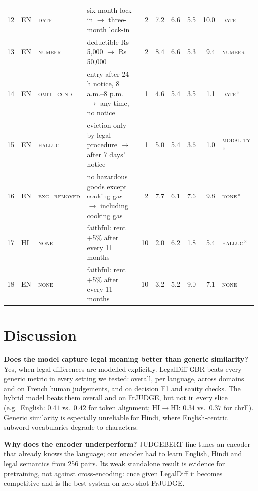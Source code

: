 \begin{table}[t]
\begin{tabular}{@{}rllp{7.4cm}rrrrrl@{}}
12 & EN & \textsc{date} & six-month lock-in $\rightarrow$ three-month lock-in & 2 & 7.2 & 6.6 & 5.5 & 10.0 & \textsc{date} \\
13 & EN & \textsc{number} & deductible Rs 5,000 $\rightarrow$ Rs 50,000 & 2 & 8.4 & 6.6 & 5.3 & 9.4 & \textsc{number} \\
14 & EN & \textsc{omit\_cond} & entry after 24-h notice, 8 a.m.--8 p.m. $\rightarrow$ any time, no notice & 1 & 4.6 & 5.4 & 3.5 & 1.1 & \textsc{date}$^{\times}$ \\
15 & EN & \textsc{halluc} & eviction only by legal procedure $\rightarrow$ after 7 days' notice & 1 & 5.0 & 5.4 & 3.6 & 1.0 & \textsc{modality}$^{\times}$ \\
16 & EN & \textsc{exc\_removed} & no hazardous goods except cooking gas $\rightarrow$ including cooking gas & 2 & 7.7 & 6.1 & 7.6 & 9.8 & \textsc{none}$^{\times}$ \\
17 & HI & \textsc{none} & faithful: rent +5\% after every 11 months & 10 & 2.0 & 6.2 & 1.8 & 5.4 & \textsc{halluc}$^{\times}$ \\
18 & EN & \textsc{none} & faithful: rent +5\% after every 11 months & 10 & 3.2 & 5.2 & 9.0 & 7.1 & \textsc{none} \\
\bottomrule
\end{tabular}
\end{table}

\section{Discussion}
\textbf{Does the model capture legal meaning better than generic similarity?} Yes, when legal differences are modelled explicitly. LegalDiff-GBR beats every generic metric in every setting we tested: overall, per language, across domains and on French human judgements, and on decision F1 and sanity checks. The hybrid model beats them overall and on FrJUDGE, but not in every slice (e.g.\ English: $0.41$ vs.\ $0.42$ for token alignment; HI$\rightarrow$HI: $0.34$ vs.\ $0.37$ for chrF). Generic similarity is especially unreliable for Hindi, where English-centric subword vocabularies degrade to characters.

\textbf{Why does the encoder underperform?} JUDGEBERT fine-tunes an encoder that already knows the language; our encoder had to learn English, Hindi and legal semantics from 256 pairs. Its weak standalone result is evidence for pretraining, not against cross-encoding: once given LegalDiff it becomes competitive and is the best system on zero-shot FrJUDGE.

